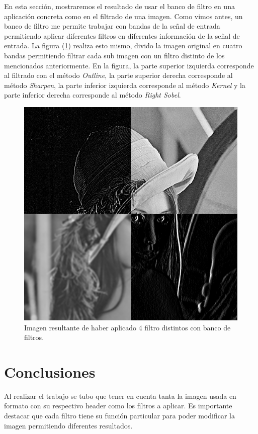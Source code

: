 En esta sección, mostraremos el resultado de usar el banco de filtro en una aplicación concreta como en el filtrado de una imagen. Como vimos antes, un banco de filtro me permite trabajar con bandas de la señal de entrada permitiendo aplicar diferentes filtros en diferentes información de la señal de entrada. La figura (\ref{fig:bff}) realiza esto mismo, divido la imagen original en cuatro bandas permitiendo filtrar cada sub imagen con un filtro distinto de los mencionados anteriormente. En la figura, la parte superior izquierda corresponde al filtrado con el método \textit{Outline}, la parte superior derecha corresponde al método \textit{Sharpen}, la parte inferior izquierda corresponde al método \textit{Kernel} y la parte inferior derecha corresponde al método \textit{Right Sobel}.

\begin{figure}[H]
	\centering
	\includegraphics[scale=0.5]{imagenes/imgBf1.png}
	\caption{Imagen resultante de haber aplicado 4 filtro distintos con banco de filtros.\label{fig:bff}}
\end{figure}

\section{Conclusiones}


	Al realizar el trabajo se tubo que tener en cuenta tanta la imagen usada en formato con su respectivo header como los filtros a aplicar. Es importante destacar que cada filtro tiene su función particular para poder modificar la imagen permitiendo diferentes resultados.
	 
